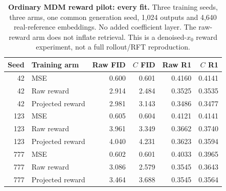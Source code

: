 \begin{table}[t]
\centering\footnotesize
\caption{\textbf{Ordinary MDM reward pilot: every fit.} Three training seeds, three arms, one common generation seed, 1,024 outputs and 4,640 real-reference embeddings. No added coefficient layer. The raw-reward arm does not inflate retrieval. This is a denoised-$x_0$ reward experiment, not a full rollout/RFT reproduction.}
\label{tab:rewardpilot}
\begin{tabular}{@{}rlrrrr@{}}\toprule
Seed&Training arm&Raw FID&$C$ FID&Raw R1&$C$ R1\\\midrule
42&MSE&0.600&0.601&0.4160&0.4141\\
42&Raw reward&2.914&2.484&0.3525&0.3535\\
42&Projected reward&2.981&3.143&0.3486&0.3477\\
123&MSE&0.605&0.604&0.4121&0.4141\\
123&Raw reward&3.961&3.349&0.3662&0.3740\\
123&Projected reward&4.040&4.231&0.3623&0.3594\\
777&MSE&0.602&0.601&0.4033&0.3965\\
777&Raw reward&3.086&2.579&0.3545&0.3643\\
777&Projected reward&3.464&3.688&0.3545&0.3564\\
\bottomrule\end{tabular}\end{table}

